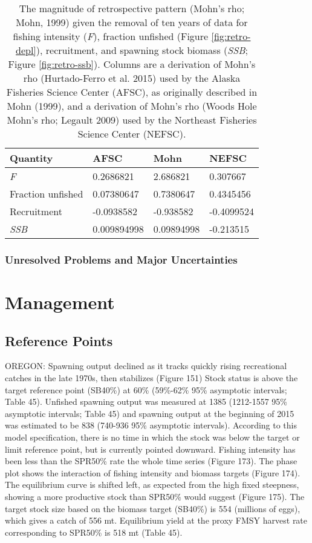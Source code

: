 \documentclass[11pt,
  english,
  letterpaper,
]{article}
\begin{document}
\begin{longtable}[t]{llll}
\caption{\label{tab:RetroMohnsrho}The magnitude of retrospective pattern (Mohn's rho; Mohn, 1999) given the removal of ten years of data for fishing intensity (\emph{F}), fraction unfished (Figure \ref{fig:retro-depl}),  recruitment, and spawning stock biomass (\emph{SSB}; Figure \ref{fig:retro-ssb}). Columns are a derivation of Mohn's rho (Hurtado-Ferro et al. 2015) used by the Alaska Fisheries Science Center (AFSC), as originally described in Mohn (1999), and a derivation of Mohn's rho (Woods Hole Mohn's rho; Legault 2009) used by the Northeast Fisheries Science Center (NEFSC).}\\
\toprule
Quantity & AFSC & Mohn & NEFSC\\
\midrule
\emph{F} & 0.2686821 & 2.686821 & 0.307667\\
Fraction unfished & 0.07380647 & 0.7380647 & 0.4345456\\
Recruitment & -0.0938582 & -0.938582 & -0.4099524\\
\emph{SSB} & 0.009894998 & 0.09894998 & -0.213515\\
\bottomrule
\end{longtable}

\hypertarget{unresolved-problems-and-major-uncertainties-1}{%
\subsubsection{Unresolved Problems and Major Uncertainties}\label{unresolved-problems-and-major-uncertainties-1}}

\hypertarget{management}{%
\section{Management}\label{management}}

\hypertarget{reference-points-1}{%
\subsection{Reference Points}\label{reference-points-1}}

OREGON: Spawning output declined as it tracks quickly rising recreational catches in the late 1970s, then stabilizes (Figure 151) Stock status is above the target reference point (SB40\%) at 60\% (59\%-62\% 95\% asymptotic intervals; Table 45). Unfished spawning output was measured at 1385 (1212-1557 95\% asymptotic intervals; Table 45) and spawning output at the beginning of 2015 was estimated to be 838 (740-936 95\% asymptotic intervals). According to this model specification, there is no time in which the stock was below the target or limit reference point, but is currently pointed downward. Fishing intensity has been less than the SPR50\% rate the whole time series (Figure 173). The phase plot shows the interaction of fishing intensity and biomass targets (Figure 174). The equilibrium curve is shifted left, as expected from the high fixed steepness, showing a more productive stock than SPR50\% would suggest (Figure 175). The target stock size based on the biomass target (SB40\%) is 554 (millions of eggs), which gives a catch of 556 mt. Equilibrium yield at the proxy FMSY harvest rate corresponding to SPR50\% is 518 mt (Table 45).
\end{document}
